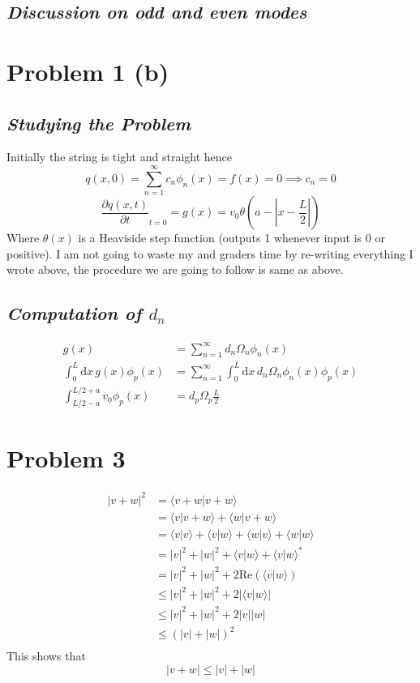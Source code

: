 \documentclass[letter]{article}
\begin{document}
\subsection*{\emph{Discussion on odd and even modes}}



\section*{Problem 1 (b)} 
\subsection*{\emph{Studying the Problem}}
Initially the string is tight and straight hence 
\[
q(x, 0) = \sum_{n=1}^{\infty} c_n \phi_n(x) = f(x) = 0 \implies \boxed{
c_n = 0
}
\] 
\[
	\frac{\partial q(x,t)}{\partial t} _{t = 0} = g(x) = v_0 \theta\left(a - \left|x - \frac{L}{2} \right|\right)
\]
Where $\theta(x)$ is a Heaviside step function (outputs 1 whenever input is 0 or positive).
I am not going to waste my and graders time by re-writing everything I wrote above, the procedure we are going to follow is same as above. 

\subsection*{\emph{Computation of $d_n$ }}
\begin{align*}
	g(x) &= \sum_{n=1}^{\infty} d_n \Omega_n \phi_n(x)   \\
\int_{0}^{L} \mathrm{d} x\, 	g(x) \phi_p (x) &= \sum_{n=1}^{\infty}  \int_{0}^{L} \mathrm{d} x \, d_n \Omega_n \phi_n (x) \phi_p (x)\\
\int_{L / 2 - a}^{L / 2  + a} v_0 \phi_p (x) &= d_p  \Omega_p \frac{L}{2}
\end{align*} 


\section*{Problem 3}
\begin{align*}
	| v + w | ^2 &=   \langle v + w | v + w \rangle  \\ 
	&= \langle v | v + w \rangle  + \langle w | v + w \rangle \\
	&=  \langle v | v \rangle + \langle v | w \rangle + 
	\langle w | v \rangle + \langle w | w \rangle \\ 
	&= | v | ^2 + | w | ^2 + \langle v| w \rangle + \langle v | w \rangle^* \\
	&= | v | ^2 + | w | ^2 + 2 \text{Re}\left( \langle v | w \rangle\right) \\
	&\le  |v|^2 + |w|^2 + 2 | \langle v | w \rangle |  \\
	&\le  |v|^2 + |w|^2 + 2 |v  | | w |  \\ 
	&\le \left( |v| + |w|\right)^2 \\
\end{align*}
This shows that 
\[
|v + w |  \le |v| + |w| 
\] 
\end{document}

